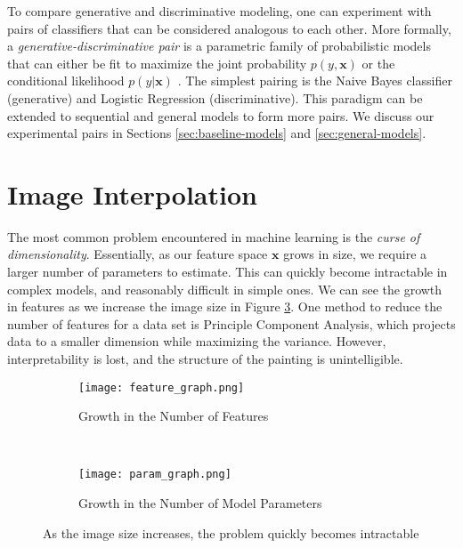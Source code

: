 \documentclass{article}
\begin{document}
To compare generative and discriminative modeling, one can experiment
with pairs of classifiers that can be considered analogous to each other.
More formally, a \textit{generative-discriminative pair} is a parametric
family of probabilistic models that can either be fit to maximize the joint
probability $p(y, \mathbf{x})$ or the conditional
likelihood $p(y | \mathbf{x})$ \cite{NgJordan}. The simplest pairing is
the Naive Bayes classifier (generative) and Logistic Regression
(discriminative). This paradigm can be extended to sequential and general
models to form more pairs. We discuss our experimental pairs
in Sections \ref{sec:baseline-models} and \ref{sec:general-models}.




\section{Image Interpolation}
\label{sec:img-interpolation}
The most common problem encountered in machine learning is the
\textit{curse of dimensionality}. Essentially, as our feature space
$\mathbf{x}$ grows in size, we require a larger number of parameters to
estimate. This can quickly become intractable in complex models, and
reasonably difficult in simple ones. We can see the growth
in features as we increase the image size in Figure \ref{fig:feature-size}.
One method to reduce the number of
features for a data set is Principle Component Analysis, which projects
data to a smaller dimension while maximizing the variance. However,
interpretability is lost, and the structure of the painting is unintelligible.

\begin{figure}[h!]
  \centering
  \begin{subfigure}[b]{0.45\textwidth}
    \centering
    \texttt{[image: feature\_graph.png]}
    \caption{Growth in the Number of Features}
    \label{fig:feature-graph}
  \end{subfigure}
  ~
  \begin{subfigure}[b]{0.45\textwidth}
    \centering
    \texttt{[image: param\_graph.png]}
    \caption{Growth in the Number of Model Parameters}
    \label{fig:param-graph}
  \end{subfigure}
  \caption{As the image size increases, the problem quickly becomes intractable}
  \label{fig:feature-size}
\end{figure}
\end{document}
